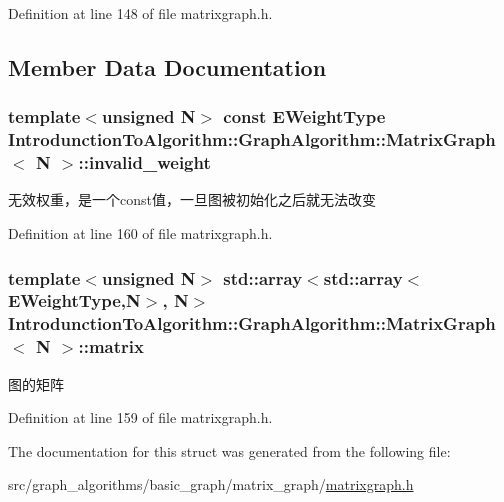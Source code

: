 Definition at line 148 of file matrixgraph.\+h.



\subsection{Member Data Documentation}
\hypertarget{struct_introdunction_to_algorithm_1_1_graph_algorithm_1_1_matrix_graph_a015ceb5dcacd9d1bc1e67e5cf331aa7f}{}
\subsubsection[{invalid\+\_\+weight}]{\setlength{\rightskip}{0pt plus 5cm}template$<$unsigned N$>$ const {\bf E\+Weight\+Type} {\bf Introdunction\+To\+Algorithm\+::\+Graph\+Algorithm\+::\+Matrix\+Graph}$<$ N $>$\+::invalid\+\_\+weight}\label{struct_introdunction_to_algorithm_1_1_graph_algorithm_1_1_matrix_graph_a015ceb5dcacd9d1bc1e67e5cf331aa7f}
无效权重，是一个const值，一旦图被初始化之后就无法改变 

Definition at line 160 of file matrixgraph.\+h.

\hypertarget{struct_introdunction_to_algorithm_1_1_graph_algorithm_1_1_matrix_graph_a7808a578d4c380baa6de5d4b23bcc84f}{}
\subsubsection[{matrix}]{\setlength{\rightskip}{0pt plus 5cm}template$<$unsigned N$>$ std\+::array$<$std\+::array$<${\bf E\+Weight\+Type},N$>$, N$>$ {\bf Introdunction\+To\+Algorithm\+::\+Graph\+Algorithm\+::\+Matrix\+Graph}$<$ N $>$\+::matrix}\label{struct_introdunction_to_algorithm_1_1_graph_algorithm_1_1_matrix_graph_a7808a578d4c380baa6de5d4b23bcc84f}
图的矩阵 

Definition at line 159 of file matrixgraph.\+h.



The documentation for this struct was generated from the following file\+:\begin{DoxyCompactItemize}
\item 
src/graph\+\_\+algorithms/basic\+\_\+graph/matrix\+\_\+graph/\hyperlink{matrixgraph_8h}{matrixgraph.\+h}\end{DoxyCompactItemize}

